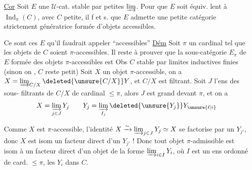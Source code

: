 

 

\uline{Cor} Soit $E$ une $\mathcal U$-cat. stable par petites $\varinjlim$. Pour que  $E$ soit équiv. lent à  $\operatorname{Ind}_\pi(C)$, avec $C$ petite,  il f et s. que $E$ admette une petite catégorie strictement génératrice formée d'objets accessibles.

Ce sont ces $E$ qu'il faudrait appeler ``accessibles''
\uline{Dém} Soit $\pi$ un cardinal  tel que les objets de $C$ soient $\pi$-accessibles. Il reste à prouver que la sous-catégorie $E_\pi$ de $E$ formée des objets $\pi$-accessibles est     Obs $C$ stable par limites inductives finies (sinon on , $C$ reste  petit) Soit $X$ un objet $\pi$-accessible, on a  $X=\varinjlim_{C/X}\deleted{\unsure{C/X}}Y$, et $C/X$ est filtrant.  Soit $J$ l'ens des sous-  filtrants  de $C/X$ de cardinal $\leq\pi$, alors $J$ est  grand devant $\pi$, et on a
\[
 X=\varinjlim_{j\in J}Y_j\qquad Y_j=\varinjlim_{I_j}\deleted{\unsure{Y_j}}Y_{\unsure{\ell|i}}
\]

Comme $X$ est $\pi$-accessible,  l'identité $X\xrightarrow{\sim}\varinjlim_{j\in J}Y_j\simeq X$ se factorise par un $Y_{j'}$, donc $X$ est isom  un facteur direct d'un $Y_{j'}$ ! Donc tout objet $\pi$-admissible est isom à un facteur direct d'un objet de la forme $\varinjlim_{i\in I}Y_i$, où  $I$ est un ens  ordonné de card. $\leq\pi$, les $Y_i$ dans $C$.

